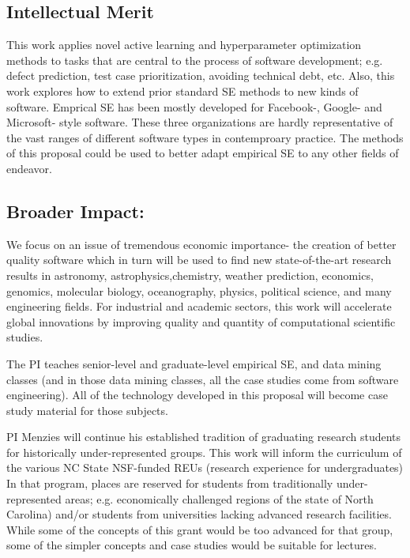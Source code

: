 \documentclass{NSF}
\begin{document}
\begin{nsfdescription}
\subsection{Intellectual Merit}
This work applies novel active learning and hyperparameter  optimization methods to tasks
that are  central
to the process of software development;
e.g. defect prediction, test case prioritization,
avoiding technical debt, etc.
Also, this work explores how to extend prior standard
SE methods to new kinds of software.
Emprical  SE has been mostly developed for Facebook-, Google- and Microsoft- style software. These three
organizations
are hardly representative of the vast
ranges of  different software types in contemproary practice.  The methods of this proposal 
 could be used to better adapt empirical SE to any other fields of endeavor.


 

\subsection{Broader Impact:} 
We focus on an issue of tremendous economic importance- the creation of better quality software which in turn will be used to find new state-of-the-art research results
in astronomy, astrophysics,chemistry, weather prediction, economics,  genomics,  molecular   biology,    oceanography, physics,  political  science,  and many engineering fields.
For industrial and academic sectors, this work will accelerate global innovations by improving quality and quantity of computational scientific studies.

The PI   teaches senior-level and graduate-level empirical SE, and data  mining classes (and in those data mining classes, all the case studies come from software  engineering). All of the technology developed in this proposal will become case study material for those subjects.  
 
PI Menzies will continue his established tradition of graduating research students for historically under-represented groups. This work will inform the curriculum of  the various NC State  NSF-funded REUs (research experience for undergraduates)
In that program, places are reserved for students from traditionally under-represented areas; e.g. economically challenged regions of the state of North Carolina) and/or students from universities lacking advanced research facilities. While some of the concepts of this grant would be too advanced for that group, some of the simpler concepts and case studies would be suitable for lectures.
  


\end{nsfdescription}
\end{document}

